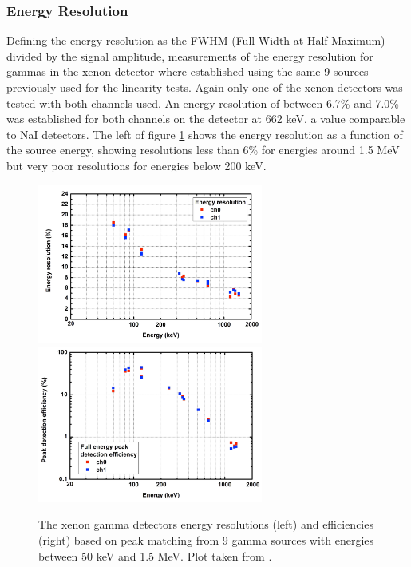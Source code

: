 \subsubsection{Energy Resolution}
Defining the energy resolution as the FWHM (Full Width at Half Maximum) divided by the signal amplitude, measurements of the energy resolution for gammas in the xenon detector where established using the same 9 sources previously used for the linearity tests. Again only one of the xenon detectors was tested with both channels used. An energy resolution of between 6.7\% and 7.0\% \cite{modesInternal} was established for both channels on the detector at 662 keV, a value comparable to NaI detectors. The left of figure \ref{fig:modesXenonEnergyResolution} shows the energy resolution as a function of the source energy, showing resolutions less than 6\% for energies around 1.5 MeV but very poor resolutions for energies below 200 keV. 

\begin{figure}[htbp]
\begin{center}
\includegraphics[width=74mm]{Chapter8/figures/energyResolutionXeGammaDetector.pdf}
\includegraphics[width=74mm]{Chapter8/figures/efficienciesXeGammaDetector.pdf}
\caption{The xenon gamma detectors energy resolutions (left) and efficiencies (right) based on peak matching from 9 gamma sources with energies between 50 keV and 1.5 MeV. Plot taken from \cite{modesInternal}.}
\label{fig:modesXenonEnergyResolution}
\end{center}
\end{figure}

